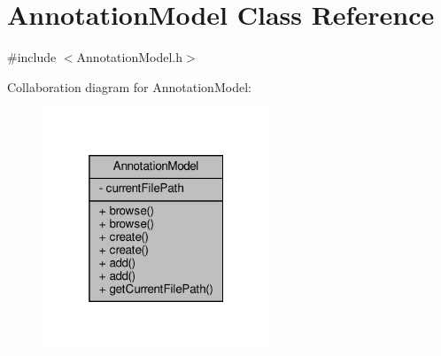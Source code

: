 \hypertarget{classAnnotationModel}{}\section{Annotation\+Model Class Reference}
\label{classAnnotationModel}


{\ttfamily \#include $<$Annotation\+Model.\+h$>$}



Collaboration diagram for Annotation\+Model\+:
\nopagebreak
\begin{figure}[H]
\begin{center}
\leavevmode
\includegraphics[width=193pt]{classAnnotationModel__coll__graph}
\end{center}
\end{figure}
